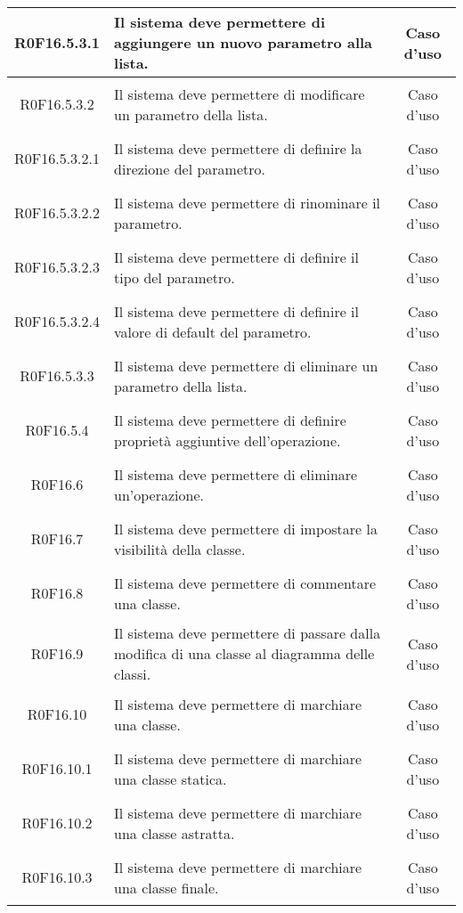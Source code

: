 \documentclass[../AnalisiDeiRequisiti.tex]{subfiles}
\begin{document}
\begin{longtable}{|c|>{\centering}p{7cm}|c|}
\hypertarget{R0F16.5.3.1}{R0F16.5.3.1} & Il sistema deve permettere di aggiungere un nuovo parametro alla lista. & Caso d'uso \\ \hline
\hypertarget{R0F16.5.3.2}{R0F16.5.3.2} & Il sistema deve permettere di modificare un parametro della lista. & Caso d'uso \\ \hline
\hypertarget{R0F16.5.3.2.1}{R0F16.5.3.2.1} & Il sistema deve permettere di definire la direzione del parametro. & Caso d'uso \\ \hline
\hypertarget{R0F16.5.3.2.2}{R0F16.5.3.2.2} & Il sistema deve permettere di rinominare il parametro. & Caso d'uso \\ \hline
\hypertarget{R0F16.5.3.2.3}{R0F16.5.3.2.3} & Il sistema deve permettere di definire il tipo del parametro. & Caso d'uso \\ \hline
\hypertarget{R0F16.5.3.2.4}{R0F16.5.3.2.4} & Il sistema deve permettere di definire il valore di default del parametro.  & Caso d'uso \\ \hline
\hypertarget{R0F16.5.3.3}{R0F16.5.3.3} & Il sistema deve permettere di eliminare un parametro della lista. & Caso d'uso \\ \hline
\hypertarget{R0F16.5.4}{R0F16.5.4} & Il sistema deve permettere di definire proprietà aggiuntive dell'operazione. & Caso d'uso \\ \hline
\hypertarget{R0F16.6}{R0F16.6} & Il sistema deve permettere di eliminare un'operazione.  & Caso d'uso \\ \hline
\hypertarget{R0F16.7}{R0F16.7} & Il sistema deve permettere di impostare la visibilità della classe. & Caso d'uso \\ \hline
\hypertarget{R0F16.8}{R0F16.8} & Il sistema deve permettere di commentare una classe. & Caso d'uso \\ \hline
\hypertarget{R0F16.9}{R0F16.9} & Il sistema deve permettere di passare dalla modifica di una classe al diagramma delle classi. & Caso d'uso \\ \hline
\hypertarget{R0F16.10}{R0F16.10} & Il sistema deve permettere di marchiare una classe. & Caso d'uso \\ \hline
\hypertarget{R0F16.10.1}{R0F16.10.1} & Il sistema deve permettere di marchiare una classe statica. & Caso d'uso \\ \hline
\hypertarget{R0F16.10.2}{R0F16.10.2} & Il sistema deve permettere di marchiare una classe astratta. & Caso d'uso \\ \hline
\hypertarget{R0F16.10.3}{R0F16.10.3} & Il sistema deve permettere di marchiare una classe finale. & Caso d'uso \\ \hline

\end{longtable}
\end{document}
